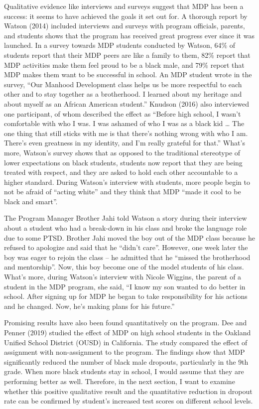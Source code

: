 Qualitative evidence like interviews and surveys suggest that MDP has been a success: it seems to have achieved the goals it set out for. A thorough report by Watson (2014) included interviews and surveys with program officials, parents, and students shows that the program has received great progress ever since it was launched. In a survey towards MDP students conducted by Watson, 64$\%$ of students report that their MDP peers are like a family to them, 82$\%$ report that MDP activities make them feel proud to be a black male, and 79$\%$ report that MDP makes them want to be successful in school. An MDP student wrote in the survey, “Our Manhood Development class helps us be more respectful to each other and to stay together as a brotherhood. I learned about my heritage and about myself as an African American student.” Knudson (2016) also interviewed one participant, of whom described the effect as “Before high school, I wasn’t comfortable with who I was. I was ashamed of who I was as a black kid … The one thing that still sticks with me is that there’s nothing wrong with who I am. There’s even greatness in my identity, and I’m really grateful for that.” What’s more, Watson’s survey shows that as opposed to the traditional stereotype of lower expectations on black students, students now report that they are being treated with respect, and they are asked to hold each other accountable to a higher standard. During Watson’s interview with students, more people begin to not be afraid of “acting white” and they think that MDP “made it cool to be black and smart”. 

The Program Manager Brother Jahi told Watson a story during their interview about a student who had a break-down in his class and broke the language role due to some PTSD. Brother Jahi moved the boy out of the MDP class because he refused to apologize and said that he “didn’t care”. However, one week later the boy was eager to rejoin the class – he admitted that he “missed the brotherhood and mentorship”. Now, this boy become one of the model students of his class. What’s more, during Watson’s interview with Nicole Wiggins, the parent of a student in the MDP program, she said, “I know my son wanted to do better in school. After signing up for MDP he began to take responsibility for his actions and he changed. Now, he’s making plans for his future.”

Promising results have also been found quantitatively on the program. Dee and Penner (2019) studied the effect of MDP on high school students in the Oakland Unified School District (OUSD) in California. The study compared the effect of assignment with non-assignment to the program. The findings show that MDP significantly reduced the number of black male dropouts, particularly in the 9th grade. When more black students stay in school, I would assume that they are performing better as well. Therefore, in the next section, I want to examine whether this positive qualitative result and the quantitative reduction in dropout rate can be confirmed by student's increased test scores on different school levels.
